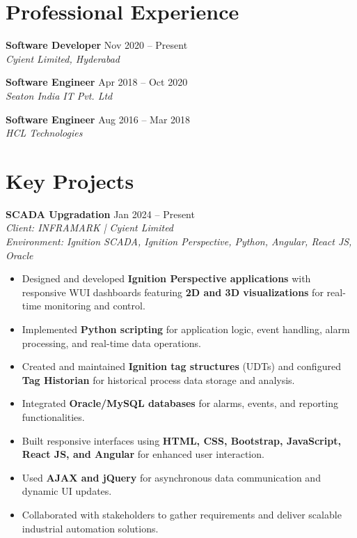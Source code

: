 \documentclass[9.5pt, letterpaper]{article}
\begin{document}
\section{Professional Experience}

\textbf{Software Developer} \hfill Nov 2020 -- Present \\
\textit{Cyient Limited, Hyderabad}

\textbf{Software Engineer} \hfill Apr 2018 -- Oct 2020 \\
\textit{Seaton India IT Pvt. Ltd}

\textbf{Software Engineer} \hfill Aug 2016 -- Mar 2018 \\
\textit{HCL Technologies}

\section{Key Projects}

\textbf{SCADA Upgradation} \hfill Jan 2024 -- Present \\
\textit{Client: INFRAMARK | Cyient Limited} \\
\textit{Environment: Ignition SCADA, Ignition Perspective, Python, Angular, React JS, Oracle}

\begin{itemize}
    \item Designed and developed \textbf{Ignition Perspective applications} with responsive WUI dashboards featuring \textbf{2D and 3D visualizations} for real-time monitoring and control.
    \item Implemented \textbf{Python scripting} for application logic, event handling, alarm processing, and real-time data operations.
    \item Created and maintained \textbf{Ignition tag structures} (UDTs) and configured \textbf{Tag Historian} for historical process data storage and analysis.
    \item Integrated \textbf{Oracle/MySQL databases} for alarms, events, and reporting functionalities.
    \item Built responsive interfaces using \textbf{HTML, CSS, Bootstrap, JavaScript, React JS, and Angular} for enhanced user interaction.
    \item Used \textbf{AJAX and jQuery} for asynchronous data communication and dynamic UI updates.
    \item Collaborated with stakeholders to gather requirements and deliver scalable industrial automation solutions.
\end{itemize}
\end{document}
